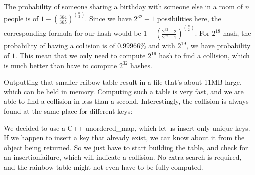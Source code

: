 \documentclass[4apaper]{report}
\begin{document}
The probability of someone sharing a birthday with someone else in a room of $n$ people is of $1 - (\frac {364}{365})^{\binom {n}{2}}$. Since we have $2^{32}-1$ possibilities here, the corresponding formula for our hash would be  $1 - (\frac {2^{32}-2}{2^{32}-1})^{\binom {n}{2}}$. For $2^{18}$ hash, the probability of having a collision is of $0.99966\%$ and with $2^{19}$, we have probability of $1$. This mean that we only need to compute $2^19$ hash to find a collision, which is much better than have to compute $2^{32}$ hashes.

Outputting that smaller raibow table result in a file that's about 11MB large, which can be held in memory. Computing such a table is very fast, and we are able to find a collision in less than a second. Interestingly, the collision is always found at the same place for different keys: 

We decided to use a C++ unordered_map, which let us insert only unique keys. If we happen to insert a key that already exist, we can know about it from the object being returned. So we just have to start building the table, and check for an insertionfailure, which will indicate a collision. No extra search is required, and the rainbow table might not even have to be fully computed.
\end{document}
